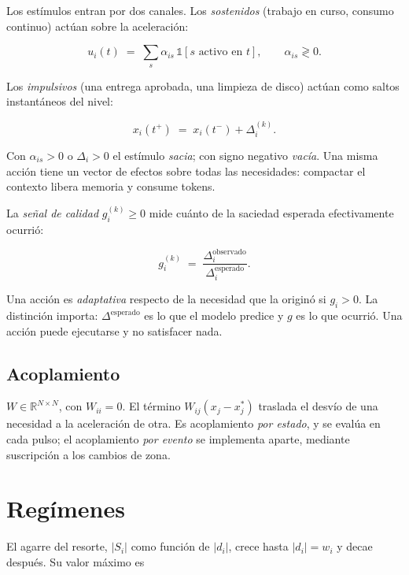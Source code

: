 \documentclass[11pt,a4paper]{article}
\newcommand{\Real}{\mathbb{R}}
\begin{document}
Los estímulos entran por dos canales. Los \emph{sostenidos} (trabajo en curso, consumo
continuo) actúan sobre la aceleración:

\begin{equation}
  u_i(t) \;=\; \sum_{s} \alpha_{is}\, \mathbb{1}\!\left[s \text{ activo en } t\right],
  \qquad \alpha_{is} \gtrless 0 .
\end{equation}

Los \emph{impulsivos} (una entrega aprobada, una limpieza de disco) actúan como saltos
instantáneos del nivel:

\begin{equation}
  x_i(t^{+}) \;=\; x_i(t^{-}) + \Delta_{i}^{(k)} .
\end{equation}

Con $\alpha_{is}>0$ o $\Delta_i>0$ el estímulo \emph{sacia}; con signo negativo
\emph{vacía}. Una misma acción tiene un vector de efectos sobre todas las necesidades:
compactar el contexto libera memoria y consume tokens.

La \emph{señal de calidad} $g^{(k)}_i \ge 0$ mide cuánto de la saciedad esperada
efectivamente ocurrió:

\begin{equation}
  g^{(k)}_i \;=\; \frac{\Delta_i^{\text{observado}}}{\Delta_i^{\text{esperado}}} .
\end{equation}

Una acción es \emph{adaptativa} respecto de la necesidad que la originó si $g_i>0$.
La distinción importa: $\Delta^{\text{esperado}}$ es lo que el modelo predice y
$g$ es lo que ocurrió. Una acción puede ejecutarse y no satisfacer nada.

\subsection{Acoplamiento}

$W \in \Real^{N\times N}$, con $W_{ii}=0$. El término $W_{ij}(x_j-x_j^{*})$ traslada el
desvío de una necesidad a la aceleración de otra. Es acoplamiento \emph{por estado}, y se
evalúa en cada pulso; el acoplamiento \emph{por evento} se implementa aparte, mediante
suscripción a los cambios de zona.

\section{Regímenes}
\label{sec:regimenes}

El agarre del resorte, $|S_i|$ como función de $|d_i|$, crece hasta $|d_i|=w_i$ y decae
después. Su valor máximo es
\end{document}
